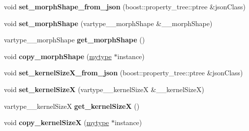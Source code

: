 \begin{DoxyCompactItemize}
\item 
\mbox{\label{classfilter_1_1algos_1_1_dilate_a349038c6c0380dbc3f6f04d2d6e47bcb}} 
void {\bfseries set\+\_\+morph\+Shape\+\_\+from\+\_\+json} (boost\+::property\+\_\+tree\+::ptree \&json\+Class)
\item 
\mbox{\label{classfilter_1_1algos_1_1_dilate_a512fcacd934ac8fd6d76c82dcf4ce8a9}} 
void {\bfseries set\+\_\+morph\+Shape} (vartype\+\_\+\+\_\+morph\+Shape \&\+\_\+\+\_\+morph\+Shape)
\item 
\mbox{\label{classfilter_1_1algos_1_1_dilate_af4f1e99014e2e733ff3924db5be2b240}} 
vartype\+\_\+\+\_\+morph\+Shape {\bfseries get\+\_\+morph\+Shape} ()
\item 
\mbox{\label{classfilter_1_1algos_1_1_dilate_a9ad0a58e202b3e4de86336413b46d062}} 
void {\bfseries copy\+\_\+morph\+Shape} (\hyperlink{classfilter_1_1algos_1_1_dilate}{mytype} $\ast$instance)
\item 
\mbox{\label{classfilter_1_1algos_1_1_dilate_a75feddb586e15d6b686405bfedc7c27c}} 
void {\bfseries set\+\_\+kernel\+Size\+X\+\_\+from\+\_\+json} (boost\+::property\+\_\+tree\+::ptree \&json\+Class)
\item 
\mbox{\label{classfilter_1_1algos_1_1_dilate_ad5261f0c94b0fa43e982deadf5c3cdb0}} 
void {\bfseries set\+\_\+kernel\+SizeX} (vartype\+\_\+\+\_\+kernel\+SizeX \&\+\_\+\+\_\+kernel\+SizeX)
\item 
\mbox{\label{classfilter_1_1algos_1_1_dilate_af5dbbd622edbc6f492ef8991dea98e49}} 
vartype\+\_\+\+\_\+kernel\+SizeX {\bfseries get\+\_\+kernel\+SizeX} ()
\item 
\mbox{\label{classfilter_1_1algos_1_1_dilate_a6a79def683c8acd90b96bf3cb8744929}} 
void {\bfseries copy\+\_\+kernel\+SizeX} (\hyperlink{classfilter_1_1algos_1_1_dilate}{mytype} $\ast$instance)
\item 
\mbox{\label{classfilter_1_1algos_1_1_dilate_a778b8d199af54072cd1401773f2afc99}} 

\end{DoxyCompactItemize}

